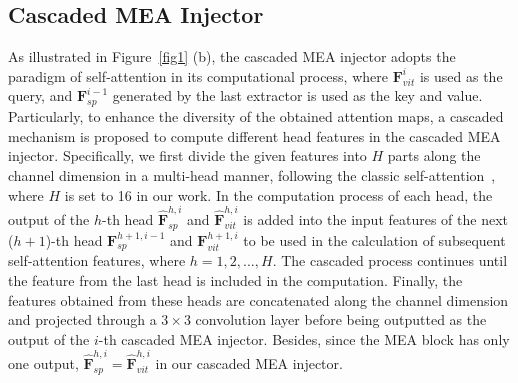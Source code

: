 \subsection{Cascaded MEA Injector}
\label{sec:3:3}
As illustrated in Figure~\ref{fig1} (b), the cascaded MEA injector adopts the paradigm of self-attention in its computational process, where $\textbf{F}^i_{vit}$ is used as the query, and $\textbf{F}^{i-1}_{sp}$ generated by the last extractor is used as the key and value. 
%
Particularly, to enhance the diversity of the obtained attention maps, a cascaded mechanism is proposed to compute different head features in the cascaded MEA injector. Specifically, we first divide the given features into $H$ parts along the channel dimension in a multi-head manner, following the classic self-attention~\citep{vaswani2017attention}, where $H$ is set to 16 in our work.
%
In the computation process of each head, the output of the $h$-th head $\hat{\textbf{F}}^{h,i}_{sp}$ and $\hat{\textbf{F}}^{h,i}_{vit}$ is added into the input features of the next ($h+1$)-th head $\textbf{F}^{h+1,i-1}_{sp}$ and $\textbf{F}^{h+1,i}_{vit}$ to be used in the calculation of subsequent self-attention features, where $h =1, 2, ..., H$. The cascaded process continues until the feature from the last head is included in the computation. Finally, the features obtained from these heads are concatenated along the channel dimension and projected through a $3 \times 3$ convolution layer before being outputted as the output of the $i$-th cascaded MEA injector. Besides, since the MEA block has only one output, $\hat{\textbf{F}}^{h,i}_{sp} = \hat{\textbf{F}}^{h,i}_{vit}$ in our cascaded MEA injector.


